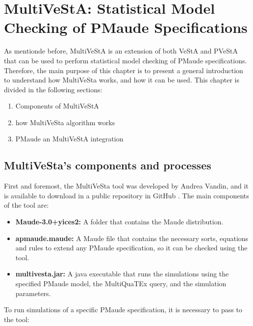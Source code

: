 \chapter{MultiVeStA: Statistical Model Checking of PMaude Specifications}

As mentionde before, MultiVeStA is an extension of both VeStA and PVeStA that can be used to perform statistical model checking of PMaude specifications. Therefore, the main purpose of this chapter is to present a general introduction to understand how MultiVeSta works, and how it can be used. This chapter is divided in the following sections:
\begin{enumerate}
    \item Components of MultiVeStA
    \item how MultiVeSta algorithm works
    \item PMaude an MultiVeStA integration
\end{enumerate}

\section{MultiVeSta's components and processes}
First and foremost, the MultiVeSta tool was developed by Andrea Vandin, and it is available to download in a public repository in GitHub \cite{multiGit}. The main components of the tool are:
\begin{itemize}
    \item \textbf{Maude-3.0+yices2:} A folder that contains the Maude distribution.
    \item \textbf{apmaude.maude:} A Maude file that contains the necessary sorts, equations and rules to extend any PMaude specification, so it can be checked using the tool. 
    \item \textbf{multivesta.jar:} A java executable that runs the simulations using the specified PMaude model, the MultiQuaTEx query, and the simulation parameters.
\end{itemize}

To run simulations of a specific PMaude specification, it is necessary to pass to the tool:

